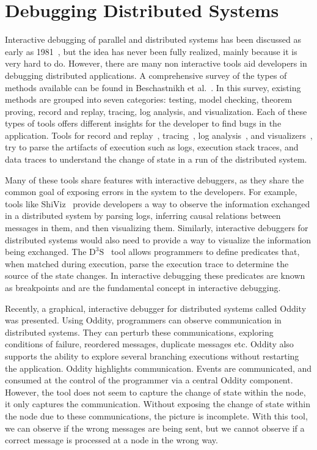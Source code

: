 \section{Debugging Distributed Systems}
\label{sec:related}

Interactive debugging of parallel and distributed systems has been discussed as early as 1981~\cite{schiffenbauer1981interactive}, but the idea has never been fully realized, mainly because it is very hard to do. However, there are many non interactive tools aid developers in debugging distributed applications. A comprehensive survey of the types of methods available can be found in Beschastnikh et al.~\cite{shiviz}. In this survey, existing methods are grouped into seven categories: testing, model checking, theorem proving, record and replay, tracing, log analysis, and visualization. Each of these types of tools offers different insights for the developer to find bugs in the application. Tools for record and replay~\cite{recordreplay, d3s, friday}, tracing~\cite{tracing, tracing2}, log analysis~\cite{loganalysis}, and visualizers~\cite{shiviz}, try to parse the artifacts of execution such as logs, execution stack traces, and data traces to understand the change of state in a run of the distributed system. 

Many of these tools share features with interactive debuggers, as they share the common goal of exposing errors in the system to the developers. For example, tools like ShiViz~\cite{shiviz} provide developers a way to observe the information exchanged in a distributed system by parsing logs, inferring causal relations between messages in them, and then visualizing them. Similarly, interactive debuggers for distributed systems would also need to provide a way to visualize the information being exchanged. The $\text{D}^{3}\text{S}$~\cite{d3s} tool allows programmers to define predicates that, when matched during execution, parse the execution trace to determine the source of the state changes. In interactive debugging these predicates are known as breakpoints and are the fundamental concept in interactive debugging.

Recently, a graphical, interactive debugger for distributed systems called Oddity~\cite{oddity} was presented. Using Oddity, programmers can observe communication in distributed systems. They can perturb these communications, exploring conditions of failure, reordered messages, duplicate messages etc. Oddity also supports the ability to explore several branching executions without restarting the application. Oddity highlights communication. Events are communicated, and consumed at the control of the programmer via a central Oddity component. However, the tool does not seem to capture the change of state within the node, it only captures the communication. Without exposing the change of state within the node due to these communications, the picture is incomplete. With this tool, we can observe if the wrong messages are being sent, but we cannot observe if a correct message is processed at a node in the wrong way.

